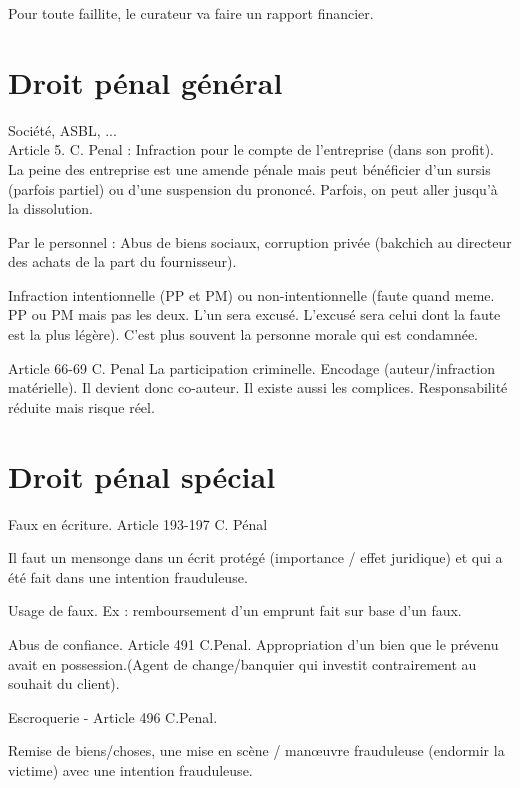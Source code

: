 \documentclass{book}
\begin{document}
Pour toute faillite, le curateur va faire un rapport financier.\\

\section{Droit pénal général}

Société, ASBL, ...\\

Article 5. C. Penal : Infraction pour le compte de l'entreprise (dans son profit). La peine des entreprise est une amende pénale mais peut bénéficier d'un sursis (parfois partiel) ou d'une suspension du prononcé. Parfois, on peut aller jusqu'à la dissolution.

Par le personnel : Abus de biens sociaux, corruption privée (bakchich au directeur des achats de la part du fournisseur).

Infraction intentionnelle (PP et PM) ou non-intentionnelle (faute quand meme. PP ou PM mais pas les deux. L'un sera excusé. L'excusé sera celui dont la faute est la plus légère). C'est plus souvent la personne morale qui est condamnée.

Article 66-69 C. Penal La participation criminelle. Encodage (auteur/infraction matérielle). Il devient donc co-auteur. Il existe aussi les complices. Responsabilité réduite mais risque réel. 

\section{Droit pénal spécial}

Faux en écriture. Article 193-197 C. Pénal

Il faut un mensonge dans un écrit protégé (importance / effet juridique) et qui a été fait dans une intention frauduleuse.

Usage de faux. Ex : remboursement d'un emprunt fait sur base d'un faux.

Abus de confiance. Article 491 C.Penal. Appropriation d'un bien que le prévenu avait en possession.(Agent de change/banquier qui investit contrairement au souhait du client).

Escroquerie - Article 496 C.Penal.

Remise de biens/choses, une mise en scène / manœuvre frauduleuse (endormir la victime) avec une intention frauduleuse.











\nocite{*}

\end{document}
